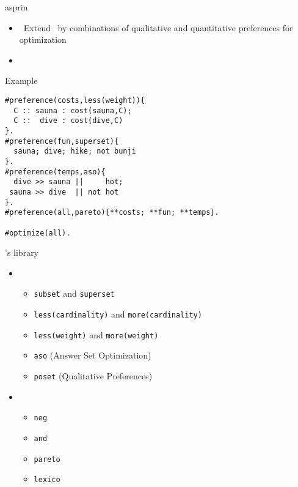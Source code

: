 \newcommand{\pf}[0]{\ensuremath{\mathit{preference}}} %
\newcommand{\name}[0]{\ensuremath{\mathit{name}}} %
\begin{frame}{asprin}
  \begin{itemize}
  \item {} \ Extend \clingo\ by combinations of qualitative and quantitative preferences for optimization
  \item {} \ \cite{brderosc15a,alrosc18a,brderosc22a}
  \end{itemize}
\end{frame}
\begin{frame}[fragile]{Example}
\begin{lstlisting}[language=clingo,basicstyle=\small\ttfamily]
#preference(costs,less(weight)){
  C :: sauna : cost(sauna,C);
  C ::  dive : cost(dive,C)
}.
#preference(fun,superset){
  sauna; dive; hike; not bunji
}.
#preference(temps,aso){
  dive >> sauna ||     hot;
 sauna >> dive  || not hot
}.
#preference(all,pareto){**costs; **fun; **temps}.

#optimize(all).
\end{lstlisting}
\end{frame}
\begin{frame}{\asprin's library}
  \begin{itemize}
  \item<1-> 
    \begin{itemize}
    \item  \texttt{subset} and \texttt{superset}
    \item  \texttt{less(cardinality)} and \texttt{more(cardinality)}
    \item  \texttt{less(weight)} and \texttt{more(weight)}
    \item  \texttt{aso}   (Answer Set Optimization) \nocite{brnitr03a}
    \item  \texttt{poset} (Qualitative Preferences) \nocite{rogima10a}
    \end{itemize}
  \item<2->  \nocite{sonpon06a}
    \begin{itemize}
    \item \texttt{neg}
    \item \texttt{and}
    \item \texttt{pareto}
    \item \texttt{lexico}
    \end{itemize}
  \end{itemize}
\end{frame}
%
